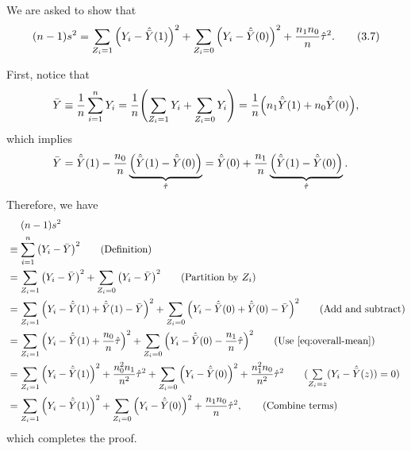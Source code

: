 \documentclass[10pt]{article}
\begin{document}
We are asked to show that
\begin{align*}
  (n - 1) s^2 
  = \sum_{Z_i = 1} {\left( Y_i - \hat{\bar{Y}}(1) \right)}^2 
    + \sum_{Z_i = 0} {\left( Y_i - \hat{\bar{Y}}(0) \right)}^2
    + \frac{n_1 n_0}{n} \hat{\tau}^2.
  \tag{3.7}
\end{align*}

First,
notice that 
\begin{align*}
  \bar{Y} \equiv \frac{1}{n} \sum_{i=1}^n Y_i 
  = \frac{1}{n} {\left( \sum_{Z_i=1} Y_i + \sum_{Z_i=0} Y_i \right)}
  = \frac{1}{n} {\left( n_1 \hat{\bar{Y}}(1) + n_0 \hat{\bar{Y}}(0) \right)},
\end{align*}
which implies
\begin{align}
  \bar{Y} 
  &= \hat{\bar{Y}}(1) 
  - \frac{n_0}{n} \underbrace{{\left( \hat{\bar{Y}}(1) - \hat{\bar{Y}}(0) \right)}}_{\hat{\tau}}
  = \hat{\bar{Y}}(0)
  + \frac{n_1}{n} \underbrace{{\left( \hat{\bar{Y}}(1) - \hat{\bar{Y}}(0) \right)}}_{\hat{\tau}}. 
    \label{eq:overall-mean}
\end{align}
Therefore, we have
\begin{align*}
  &\mathrel{\phantom{=}} (n - 1) s^2 \\
  &\equiv \sum_{i = 1}^n \bp{Y_i - \bar{Y}}^2 \tag{Definition}\\
  &= \sum_{Z_i = 1} \bp{Y_i - \bar{Y}}^2 + \sum_{Z_i = 0} \bp{Y_i - \bar{Y}}^2 \tag{Partition by $Z_i$} \\
  &= \sum_{Z_i = 1} \bp{Y_i - \hat{\bar{Y}}(1) + \hat{\bar{Y}}(1) - \bar{Y}}^2 
    + \sum_{Z_i = 0} \bp{Y_i - \hat{\bar{Y}}(0) + \hat{\bar{Y}}(0) - \bar{Y}}^2 \tag{Add and subtract} \\
  &= \sum_{Z_i = 1} \bp{Y_i - \hat{\bar{Y}}(1) + \frac{n_0}{n} \hat{\tau}}^2
    + \sum_{Z_i = 0} \bp{Y_i - \hat{\bar{Y}}(0) - \frac{n_1}{n} \hat{\tau}}^2
    \tag{Use \cref{eq:overall-mean}} \\
  &= \sum_{Z_i = 1} \bp{Y_i - \hat{\bar{Y}}(1)}^2 + \frac{n_0^2 n_1}{n^2} \hat{\tau}^2 
    + \sum_{Z_i = 0} \bp{Y_i - \hat{\bar{Y}}(0)}^2 + \frac{n_1^2 n_0}{n^2} \hat{\tau}^2
    \tag{$\sum\limits_{Z_i = z}(Y_i - \hat{\bar{Y}}(z)) = 0$} \\
  &= \sum_{Z_i = 1} \bp{Y_i - \hat{\bar{Y}}(1)}^2 
    + \sum_{Z_i = 0} \bp{Y_i - \hat{\bar{Y}}(0)}^2
    + \frac{n_1 n_0}{n} \hat{\tau}^2,
    \tag{Combine terms}
\end{align*}
which completes the proof.



\printglossaries
\end{document}

